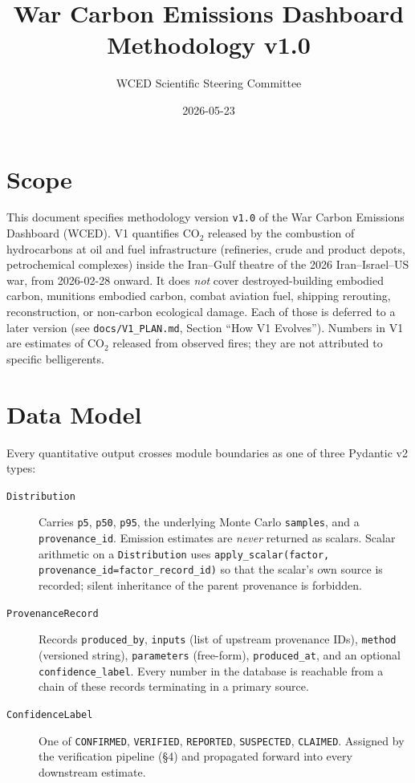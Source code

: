 \documentclass[11pt]{article}
\title{War Carbon Emissions Dashboard \\ Methodology v1.0}
\author{WCED Scientific Steering Committee}
\date{2026-05-23}
\begin{document}
\maketitle

\section{Scope}

This document specifies methodology version \texttt{v1.0} of the War Carbon
Emissions Dashboard (WCED). V1 quantifies $\mathrm{CO_2}$ released by the
combustion of hydrocarbons at oil and fuel infrastructure (refineries, crude
and product depots, petrochemical complexes) inside the Iran--Gulf theatre of
the 2026 Iran--Israel--US war, from 2026-02-28 onward. It does \emph{not}
cover destroyed-building embodied carbon, munitions embodied carbon, combat
aviation fuel, shipping rerouting, reconstruction, or non-carbon ecological
damage. Each of those is deferred to a later version (see
\texttt{docs/V1\_PLAN.md}, Section ``How V1 Evolves''). Numbers in V1 are
estimates of $\mathrm{CO_2}$ released from observed fires; they are not
attributed to specific belligerents.

\section{Data Model}

Every quantitative output crosses module boundaries as one of three Pydantic
v2 types:

\begin{description}
\item[\texttt{Distribution}] Carries \texttt{p5}, \texttt{p50},
  \texttt{p95}, the underlying Monte Carlo \texttt{samples}, and a
  \texttt{provenance\_id}. Emission estimates are \emph{never} returned as
  scalars. Scalar arithmetic on a \texttt{Distribution} uses
  \texttt{apply\_scalar(factor, provenance\_id=factor\_record\_id)} so that
  the scalar's own source is recorded; silent inheritance of the parent
  provenance is forbidden.
\item[\texttt{ProvenanceRecord}] Records \texttt{produced\_by},
  \texttt{inputs} (list of upstream provenance IDs), \texttt{method} (versioned
  string), \texttt{parameters} (free-form), \texttt{produced\_at}, and an
  optional \texttt{confidence\_label}. Every number in the database is
  reachable from a chain of these records terminating in a primary source.
\item[\texttt{ConfidenceLabel}] One of
  \texttt{CONFIRMED}, \texttt{VERIFIED}, \texttt{REPORTED}, \texttt{SUSPECTED},
  \texttt{CLAIMED}. Assigned by the verification pipeline (\S4) and
  propagated forward into every downstream estimate.
\end{description}
\end{document}
